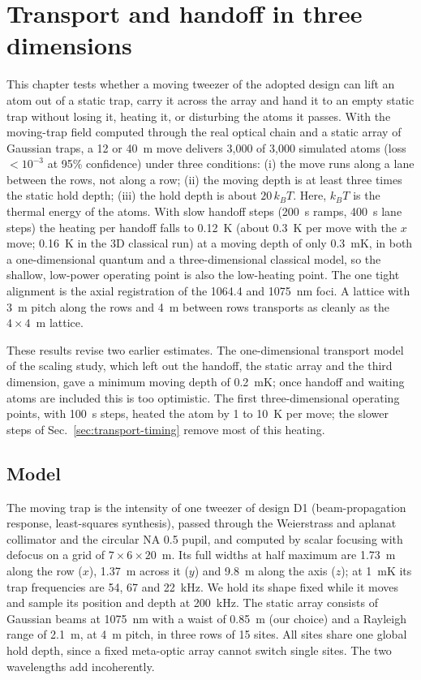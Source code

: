 \section{Transport and handoff in three dimensions}\label{sec:transport}

This chapter tests whether a moving tweezer of the adopted design can lift an atom out of a static trap, carry it across the array and hand it to an empty static trap without losing it, heating it, or disturbing the atoms it passes. With the moving-trap field computed through the real optical chain and a static array of Gaussian traps, a 12 or 40~\textmu m move delivers 3,000 of 3,000 simulated atoms (loss $<10^{-3}$ at 95\% confidence) under three conditions: (i) the move runs along a lane between the rows, not along a row; (ii) the moving depth is at least three times the static hold depth; (iii) the hold depth is about $20\,k_BT$. Here, $k_BT$ is the thermal energy of the atoms. With slow handoff steps (200~\textmu s ramps, 400~\textmu s lane steps) the heating per handoff falls to 0.12~\textmu K (about 0.3~\textmu K per move with the $x$ move; 0.16~\textmu K in the 3D classical run) at a moving depth of only 0.3~mK, in both a one-dimensional quantum and a three-dimensional classical model, so the shallow, low-power operating point is also the low-heating point. The one tight alignment is the axial registration of the 1064.4 and 1075~nm foci. A lattice with 3~\textmu m pitch along the rows and 4~\textmu m between rows transports as cleanly as the $4\times4$~\textmu m lattice.

These results revise two earlier estimates. The one-dimensional transport model of the scaling study, which left out the handoff, the static array and the third dimension, gave a minimum moving depth of 0.2~mK; once handoff and waiting atoms are included this is too optimistic. The first three-dimensional operating points, with 100~\textmu s steps, heated the atom by 1 to 10~\textmu K per move; the slower steps of Sec.~\ref{sec:transport-timing} remove most of this heating.

\subsection{Model}\label{sec:transport-model}

The moving trap is the intensity of one tweezer of design D1 (beam-propagation response, least-squares synthesis), passed through the Weierstrass and aplanat collimator and the circular NA 0.5 pupil, and computed by scalar focusing with defocus on a grid of $7\times6\times20$~\textmu m. Its full widths at half maximum are 1.73~\textmu m along the row ($x$), 1.37~\textmu m across it ($y$) and 9.8~\textmu m along the axis ($z$); at 1~mK its trap frequencies are 54, 67 and 22~kHz. We hold its shape fixed while it moves and sample its position and depth at 200~kHz. The static array consists of Gaussian beams at 1075~nm with a waist of 0.85~\textmu m (our choice) and a Rayleigh range of 2.1~\textmu m, at 4~\textmu m pitch, in three rows of 15 sites. All sites share one global hold depth, since a fixed meta-optic array cannot switch single sites. The two wavelengths add incoherently.

